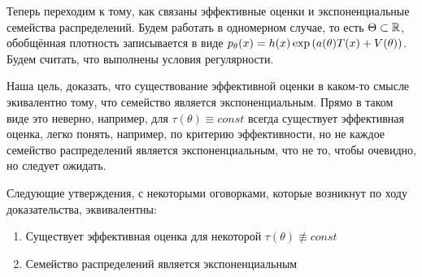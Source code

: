 \begin{note}
    Теперь переходим к тому, как связаны эффективные оценки и экспоненциальные семейства распределений. Будем работать в одномерном случае, то есть $\Theta \subset \mathbb{R}$, обобщённая плотность записывается в виде $p_\theta(x) = h(x) \exp \left(a(\theta) T(x) + V(\theta)\right)$. Будем считать, что выполнены условия регулярности.
\end{note}

\begin{note}
    Наша цель, доказать, что существование эффективной оценки в каком-то смысле экивалентно тому, что семейство является экспоненциальным. Прямо в таком виде это неверно, например, для $\tau(\theta) \equiv const$ всегда существует эффективная оценка, легко понять, например, по критерию эффективности, но не каждое семейство распределений является экспоненциальным, что не то, чтобы очевидно, но следует ожидать.
\end{note}

\begin{theorem}
    Следующие утверждения, с некоторыми оговорками, которые возникнут по ходу доказательства, эквивалентны:
    \begin{enumerate}
        \item Существует эффективная оценка для некоторой $\tau(\theta) \not\equiv const$
        \item Семейство распределений является экспоненциальным
    \end{enumerate}
\end{theorem}

